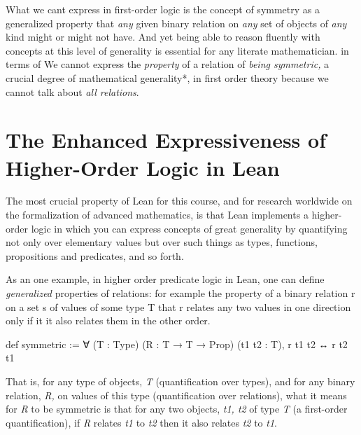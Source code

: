 \documentclass{book}
\newenvironment{Shaded}{\begin{snugshade}}{\end{snugshade}}
\newcommand{\NormalTok}[1]{#1}
\begin{document}
\begin{Shaded}
\begin{Highlighting}[]

\end{Highlighting}
\end{Shaded}

What we can\textquotesingle t express in first-order logic
is the concept of symmetry as a generalized property that \emph{any} given
binary relation on \emph{any} set of objects of \emph{any} kind might or might
not have. And yet being able to reason fluently with concepts at this
level of generality is essential for any literate mathematician.  in terms of We cannot express the \emph{property} of a relation
of \emph{being symmetric,} a crucial degree of mathematical generality*,
in first order theory because we cannot talk about \emph{all relations}.

\hypertarget{pandoc.profile.debug__pandoc__debug__src__predlogic.md__the-enhanced-expressiveness-of-higher-order-logic-in-lean}{%
\section*{The Enhanced Expressiveness of Higher-Order Logic in Lean}\label{pandoc.profile.debug__pandoc__debug__src__predlogic.md__the-enhanced-expressiveness-of-higher-order-logic-in-lean}}

The most crucial property of Lean for this course, and for research
worldwide on the formalization of advanced mathematics, is that Lean
implements a higher-order logic in which you can express concepts of
great generality by quantifying not only over elementary values but
over such things as types, functions, propositions and predicates,
and so forth.

As an one example, in higher order predicate logic
in Lean, one can define \emph{generalized} properties of relations: for
example the property of a binary relation r on a set s of values of
some type T that r relates any two values in one direction only if
it it also relates them in the other order.

\begin{Shaded}
\begin{Highlighting}[]
\NormalTok{def symmetric := }
\NormalTok{∀ (T : Type) }
\NormalTok{  (R : T → T → Prop) }
\NormalTok{  (t1 t2 : T),}
\NormalTok{r t1 t2 ↔ r t2 t1}
\end{Highlighting}
\end{Shaded}

That is, for any type of objects, \emph{T} (quantification over types), and for any binary relation, \emph{R,} on values of this type (quantification over relations), what it means for \emph{R} to be symmetric is that for any two objects, \emph{t1, t2}
of type \emph{T} (a first-order quantification), if \emph{R} relates \emph{t1} to \emph{t2} then it also relates \emph{t2} to \emph{t1}.
\end{document}
